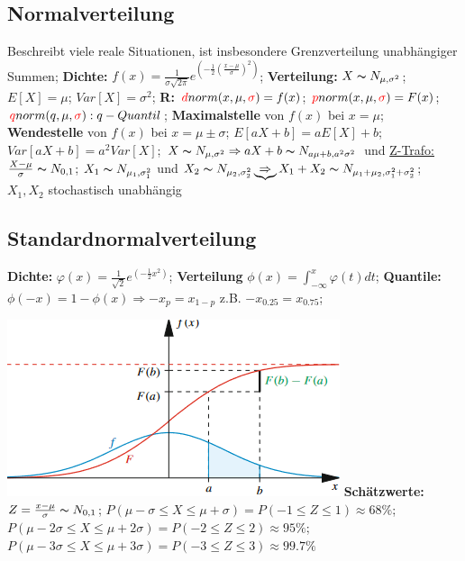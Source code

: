 \subsection{Normalverteilung}
Beschreibt viele reale Situationen, ist insbesondere Grenzverteilung unabhängiger Summen; 
\textbf{Dichte:} 
$f(x) = \frac{1}{\sigma\sqrt{2\pi}}e^{(-\frac{1}{2}(\frac{x-\mu}{\sigma})^2)}$; 
\textbf{Verteilung:} 
$X \thicksim N_{\mu, \sigma^2} $; 
$E[X] = \mu $; 
$Var[X] = \sigma^2 $; 
\textbf{R:} 
$\textcolor{red}{d} norm(x,\mu,\textcolor{red}{\sigma})=f(x) $; 
$\textcolor{red}{p} norm(x,\mu,\textcolor{red}{\sigma})=F(x) $; 
$\textcolor{red}{q} norm(q,\mu,\textcolor{red}{\sigma}):q-Quantil $; 
\textbf{Maximalstelle} von $ f(x) $ bei $ x =\mu $; 
\textbf{Wendestelle} von $ f(x) $ bei $ x = \mu \pm \sigma $; 
$ E[aX + b] = aE[X] + b $; 
$ Var [aX + b] = a^2 Var[X] $; 
$ X \thicksim N_{\mu, \sigma^2} \Rightarrow aX + b \thicksim N_{a\mu+b, a^2\sigma^2}$ und 
\underline{Z-Trafo:} $ \frac{X-\mu}{\sigma} \thicksim N_{0,1} $; 
$ X_ {1} \thicksim N_{\mu_{1}, \sigma_{1}^2}$ und $ X_{2} \thicksim N_{\mu_{2}, \sigma_{2}^2} \underbrace{\Rightarrow} X_{1} + X_{2} \thicksim N_{ \mu_{1} + \mu_{2}, \sigma_{1}^2 + \sigma_{2}^2} $;\\
$ X_{1}, X_{2} $ stochastisch unabhängig
\subsection{Standardnormalverteilung}
\textbf{Dichte:} 
$\varphi(x) = \frac{1}{\sqrt{2}}e^{(-\frac{1}{2}x^2)} $; 
\textbf{Verteilung}
$\phi(x) = \int_{-\infty}^{x} \varphi (t) dt$; 
\textbf{Quantile:} 
$ \phi (-x) = 1 - \phi (x) \Rightarrow -x_{p} = x_{1-p} $ z.B. 
$ -x_{0.25} = x_{0.75} $; 

\includegraphics[scale=0.3]{./pic/fFxcombined.png}
\textbf{Schätzwerte:}
$ Z = \frac{x-\mu}{\sigma} \thicksim N_ {0,1}$; 
$ P( \mu -\sigma \le X \le \mu + \sigma) = P ( -1 \le Z \le 1 ) \approx 68\% $; 
$ P ( \mu -2\sigma \le X \le \mu +2\sigma ) = P( -2 \le Z \le 2 ) \approx 95\% $; 
$ P( \mu - 3 \sigma \le X \le \mu + 3\sigma) = P ( -3 \le Z \le 3 ) \approx 99.7\% $

